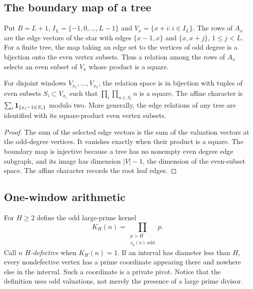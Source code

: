 \subsection{The boundary map of a tree}
Put $B=L+1$, $I_L=\{-1,0,\ldots,L-1\}$ and
$V_x=\{x+i:i\in I_L\}$. The rows of $A_x$ are the edge vectors of the
star with edges $\{x-1,x\}$ and $\{x,x+j\}$, $1\le j<L$.
For a finite tree, the map taking an edge set to the vertices of odd degree
is a bijection onto the even vertex subsets. Thus a relation among the
rows of $A_x$ selects an even subset of $V_x$ whose product is a square.

\begin{lemma}\label{lem:even-subsets}
For disjoint windows $V_{x_1},\ldots,V_{x_k}$, the relation space is in
bijection with tuples of even subsets $S_i\subset V_{x_i}$ such that
$\prod_i\prod_{n\in S_i}n$ is a square. The affine character is
$\sum_i\mathbf 1_{\{x_i-1\in S_i\}}$ modulo two.
More generally, the edge relations of any tree are identified with its
square-product even vertex subsets.
\end{lemma}
\begin{proof}
The sum of the selected edge vectors is the sum of the valuation vectors
at the odd-degree vertices. It vanishes exactly when their product is a
square. The boundary map is injective because a tree has no nonempty even
degree edge subgraph, and its image has dimension $|V|-1$, the dimension of
the even-subset space. The affine character records the root leaf edges.
\end{proof}

\subsection{One-window arithmetic}
For $H\ge2$ define the odd large-prime kernel
\[
 K_H(n)=\prod_{\substack{p>H\\v_p(n)\ \text{odd}}}p.
\]
Call $n$ \emph{$H$-defective} when $K_H(n)=1$. If an interval has diameter
less than $H$, every nondefective vertex has a prime coordinate appearing
there and nowhere else in the interval. Such a coordinate is a private
pivot. Notice that the definition uses odd valuations, not merely the
presence of a large prime divisor.

